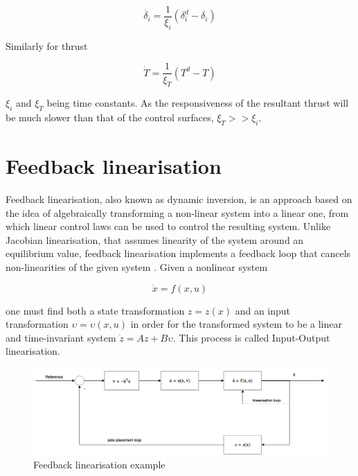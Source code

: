 \begin{equation}
\dot{\delta_i} = \dfrac{1}{\xi_i}(\delta_i^d-\delta_i)
\label{eq:actuator_dynamics}
\end{equation}

Similarly for thrust

\begin{equation}
\dot{T} = \dfrac{1}{\xi_T}(T^d-T)
\end{equation}

$\xi_i$ and $\xi_T$ being time constants. As the responsiveness of the resultant thrust will be much slower than that of the control surfaces, $\xi_T>>\xi_i$.
\section{Feedback linearisation}
\label{section:background/NLI}

Feedback linearisation, also known as dynamic inversion, is an approach based on the idea of algebraically transforming a non-linear system into a linear one, from which linear control laws can be used to control the resulting system. Unlike Jacobian linearisation, that assumes linearity of the system around an equilibrium value, feedback linearisation implements a feedback loop that cancels non-linearities of the given system \cite{Slotine+Li}. Given a nonlinear system 

\begin{equation}
\dot{x} = f(x,u)
\label{eq:nonlinear_system}
\end{equation}

one must find both a state transformation $z=z(x)$ and an input transformation $\upsilon = \upsilon(x,u)$ in order for the transformed system to be a linear and time-invariant system $\dot{z} = Az+B\upsilon$. This process is called Input-Output linearisation. 

\begin{figure}[!htb]
  \centering
  \includegraphics[width=1\textwidth]{Figures/NLI}
  \caption[Feedback linearisation example]{Feedback linearisation example \cite{Slotine+Li}}
  \label{fig:nli}
\end{figure}

